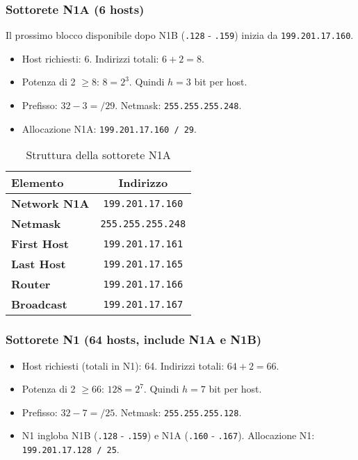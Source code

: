 \subsubsection{Sottorete N1A (6 hosts)}
Il prossimo blocco disponibile dopo N1B (\texttt{.128} - \texttt{.159}) inizia da \texttt{199.201.17.160}.
\begin{itemize}
    \item Host richiesti: 6. Indirizzi totali: $6 + 2 = 8$.
    \item Potenza di 2 $\geq 8$: $8 = 2^3$. Quindi $h=3$ bit per host.
    \item Prefisso: $32 - 3 = /29$. Netmask: \texttt{255.255.255.248}.
    \item Allocazione N1A: \texttt{199.201.17.160 / 29}.
\end{itemize}

\begin{table}[h]
\centering
\begin{tabular}{|l|c|}
\hline
\rowcolor{bg_custom}
\textcolor{primarytext}{\textbf{Elemento}} & \textcolor{primarytext}{\textbf{Indirizzo}} \\
\hline
\textbf{Network N1A} & \texttt{199.201.17.160} \\
\hline
\textbf{Netmask} & \texttt{255.255.255.248} \\
\hline
\textbf{First Host} & \texttt{199.201.17.161} \\
\hline
\textbf{Last Host} & \texttt{199.201.17.165} \\
\hline
\textbf{Router} & \texttt{199.201.17.166} \\
\hline
\textbf{Broadcast} & \texttt{199.201.17.167} \\
\hline
\end{tabular}
\caption{Struttura della sottorete N1A}
\end{table}

\subsubsection{Sottorete N1 (64 hosts, include N1A e N1B)}
\begin{itemize}
    \item Host richiesti (totali in N1): 64. Indirizzi totali: $64 + 2 = 66$.
    \item Potenza di 2 $\geq 66$: $128 = 2^7$. Quindi $h=7$ bit per host.
    \item Prefisso: $32 - 7 = /25$. Netmask: \texttt{255.255.255.128}.
    \item N1 ingloba N1B (\texttt{.128} - \texttt{.159}) e N1A (\texttt{.160} - \texttt{.167}). Allocazione N1: \texttt{199.201.17.128 / 25}.
\end{itemize}

